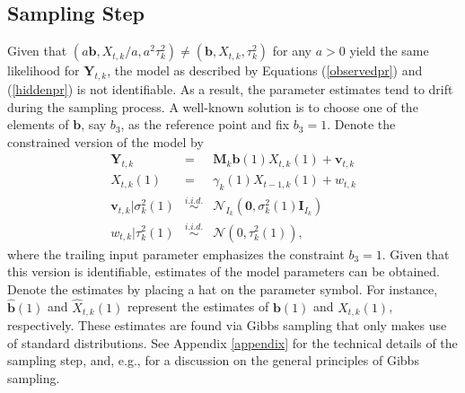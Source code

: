 \documentclass[aoas, preprint]{imsart}
\numberwithin{equation}{section}
\theoremstyle{plain}
\begin{document}
\subsection{Sampling Step}
\label{sampling_step}
Given that $\left(a \boldsymbol{b}, X_{t,k}/a, a^2 \tau_k^2\right) \neq \left(\boldsymbol{b}, X_{t,k}, \tau_k^2\right)$ for any $a > 0$ yield the same  likelihood for $\boldsymbol{Y}_{t,k}$, the model as described by Equations (\ref{observedpr}) and (\ref{hiddenpr}) is not identifiable. As a result, the parameter estimates tend to drift during the sampling process. A well-known solution is to choose one of the elements of $\boldsymbol{b}$, say $b_3$, as the reference point and fix $b_3 = 1$.  Denote the constrained version of the model by
\begin{eqnarray*}
\boldsymbol{Y}_{t, k} &=&  \boldsymbol{M}_k \boldsymbol{b} (1) X_{t, k}(1)+ \boldsymbol{v}_{t, k}\\
X_{t, k}(1) &=& \gamma_k(1) X_{t-1, k}(1) + w_{t, k}\\
\boldsymbol{v}_{t, k} | \sigma^2_k(1) &\stackrel{i.i.d.}{\sim}& \mathcal{N}_{I_k}(\boldsymbol{0}, \sigma^2_k(1) \boldsymbol{I}_{I_k})\\
w_{t, k} | \tau^2_k(1) &\stackrel{i.i.d.}{\sim}& \mathcal{N}\left(0, \tau^2_k(1)\right),
\end{eqnarray*}
where the trailing input parameter emphasizes the constraint $b_{3} = 1$. Given that this version is identifiable, estimates of the model parameters can be obtained. Denote the estimates by placing a hat on the parameter symbol. For instance, $\hat{\boldsymbol{b}}(1)$ and $\hat{X}_{t, k}(1)$ represent the estimates of $\boldsymbol{b}(1)$ and $X_{t, k}(1)$, respectively. These estimates are found via Gibbs sampling that only makes use of standard distributions. See Appendix \ref{appendix} for the technical details of the sampling step, and, e.g., \citet{gelman2003bayesian} for a discussion on the general principles of Gibbs sampling. 
\end{document}
